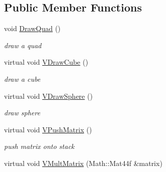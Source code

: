 \subsection*{Public Member Functions}
\begin{DoxyCompactItemize}
\item 
\hypertarget{classPlatform_1_1Renderer_1_1GL_1_1Renderer_a88500a371c2c4d498814ed121f1482ce}{
void \hyperlink{classPlatform_1_1Renderer_1_1GL_1_1Renderer_a88500a371c2c4d498814ed121f1482ce}{DrawQuad} ()}
\label{classPlatform_1_1Renderer_1_1GL_1_1Renderer_a88500a371c2c4d498814ed121f1482ce}

\begin{DoxyCompactList}\small\item\em draw a quad \item\end{DoxyCompactList}\item 
\hypertarget{classPlatform_1_1Renderer_1_1GL_1_1Renderer_a63917d1542e58bff5085f4619924fac9}{
virtual void \hyperlink{classPlatform_1_1Renderer_1_1GL_1_1Renderer_a63917d1542e58bff5085f4619924fac9}{VDrawCube} ()}
\label{classPlatform_1_1Renderer_1_1GL_1_1Renderer_a63917d1542e58bff5085f4619924fac9}

\begin{DoxyCompactList}\small\item\em draw a cube \item\end{DoxyCompactList}\item 
\hypertarget{classPlatform_1_1Renderer_1_1GL_1_1Renderer_afdbd08b6c04a2035fb06c66ee702765f}{
virtual void \hyperlink{classPlatform_1_1Renderer_1_1GL_1_1Renderer_afdbd08b6c04a2035fb06c66ee702765f}{VDrawSphere} ()}
\label{classPlatform_1_1Renderer_1_1GL_1_1Renderer_afdbd08b6c04a2035fb06c66ee702765f}

\begin{DoxyCompactList}\small\item\em draw sphere \item\end{DoxyCompactList}\item 
\hypertarget{classPlatform_1_1Renderer_1_1GL_1_1Renderer_a82182c2e53ddb1160307090eec200916}{
virtual void \hyperlink{classPlatform_1_1Renderer_1_1GL_1_1Renderer_a82182c2e53ddb1160307090eec200916}{VPushMatrix} ()}
\label{classPlatform_1_1Renderer_1_1GL_1_1Renderer_a82182c2e53ddb1160307090eec200916}

\begin{DoxyCompactList}\small\item\em push matrix onto stack \item\end{DoxyCompactList}\item 
\hypertarget{classPlatform_1_1Renderer_1_1GL_1_1Renderer_a6770d6c49dda5aa4a3160928316e4486}{
virtual void \hyperlink{classPlatform_1_1Renderer_1_1GL_1_1Renderer_a6770d6c49dda5aa4a3160928316e4486}{VMultMatrix} (Math::Mat44f \&matrix)}
\label{classPlatform_1_1Renderer_1_1GL_1_1Renderer_a6770d6c49dda5aa4a3160928316e4486}


\end{DoxyCompactItemize}
